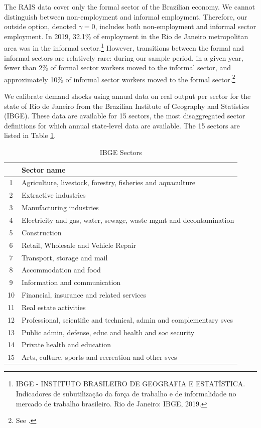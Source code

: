 \documentclass[12pt]{article}
\def\g{\gamma}
\theoremstyle{definition}
\theoremstyle{plain}
\begin{document}
The RAIS data  cover only the formal sector of the Brazilian economy. We cannot distinguish between non-employment and informal employment. Therefore, our outside option, denoted $\g=0$,  includes both non-employment and informal sector employment.  In 2019, 32.1\% of employment in the Rio de Janeiro metropolitan area was in the informal sector.\footnote{IBGE - INSTITUTO BRASILEIRO DE GEOGRAFIA E ESTATÍSTICA. Indicadores de subutilização da força de trabalho e de informalidade no mercado de trabalho brasileiro. Rio de Janeiro: IBGE, 2019.} However, transitions between the formal and informal sectors are relatively rare: during our sample period, in a given year, fewer than 2\% of formal sector workers moved to the informal sector, and approximately 10\% of informal sector workers moved to the formal sector.\footnote{See \citet[ Figure 21]{EngbomGonzagaMoserOlivieri2021}.}

We calibrate demand shocks using annual data on real output per sector for the state of Rio de Janeiro from the Brazilian Institute of Geography and Statistics  (IBGE). These data are available for 15 sectors, the most disaggregated sector definitions for which annual state-level data are available. The 15 sectors are listed in Table \ref{table:IBGE_sectors}. 


\begin{table}
	\centering
	\caption{IBGE Sectors}
	\begin{tabular}{cl}
		\toprule
		& Sector name \\
		\midrule
		1	& Agriculture, livestock, forestry, fisheries and aquaculture  \\
		2	& Extractive industries  \\
		3	& Manufacturing industries  \\
		4	& Electricity and gas, water, sewage, waste mgmt and decontamination  \\
		5	& Construction  \\
		6	& Retail, Wholesale and Vehicle Repair  \\
		7	& Transport, storage and mail  \\
		8	& Accommodation and food  \\
		9	& Information and communication  \\
		10	& Financial, insurance and related services  \\
		11	& Real estate activities  \\
		12	& Professional, scientific and technical, admin and complementary svcs  \\
		13	& Public admin, defense, educ and health and soc security  \\
		14	& Private health and education  \\
		15	& Arts, culture, sports and recreation and other svcs \\
		\bottomrule
	\end{tabular}
	\label{table:IBGE_sectors}
\end{table}
\end{document}
